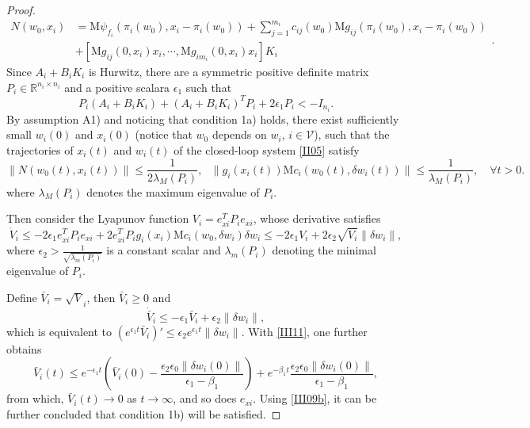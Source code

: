 \documentclass[onecolumn,a4paper,12pt]{article}
\newcommand{\real}{\mathbb{R}}
\numberwithin{equation}{section}
\begin{document}
\begin{proof}
\begin{equation}
\begin{split}
N(w_0,x_i)&=\mathrm{M}\psi_{f_i}(\pi_i(w_0),x_i-\pi_i(w_0))+\sum_{j=1}^{m_i} c_{ij}(w_0)\mathrm{M}g_{ij}(\pi_i(w_0),x_i-\pi_i(w_0)) \\&+
  \left[\mathrm{M}g_{ij}(0,x_i)x_i,\cdots, \mathrm{M}g_{im_i}(0,x_i)x_i\right]K_i
\end{split}.
\end{equation}
Since $A_i+B_iK_i$ is Hurwitz, there are a symmetric positive definite matrix $P_i\in\real^{n_i\times n_i}$ and a positive scalara $\epsilon_1$ such that
\begin{equation}
  \label{III17}
P_i(A_i+B_iK_i)+(A_i+B_iK_i)^TP_i+2\epsilon_1P_i<-I_{n_i}.
\end{equation}
By assumption A1) and noticing that condition 1a) holds, there exist sufficiently small $w_i(0)$ and $x_i(0)$ (notice that $w_0$ depends on $w_i$, $i\in\mathcal{V}$), such that the trajectories of $x_i(t)$ and $w_i(t)$ of the closed-loop system \eqref{II05} satisfy
\begin{equation}
  \|N(w_0(t),x_i(t))\|\le \frac{1}{2\lambda_M(P_i)},\,\, \,\, \|g_i(x_i(t))\mathrm{M}c_i(w_0(t),\delta w_i(t))\|\le \frac{1}{\lambda_M(P_i)}, \quad \forall t>0.
\end{equation}
where $\lambda_M(P_i)$ denotes the maximum eigenvalue of $P_i$.

Then consider the Lyapunov function $V_i=e_{xi}^TP_ie_{xi}$, whose derivative satisfies
\begin{equation}
  \dot{V}_i\le - 2\epsilon_1e_{xi}^TP_ie_{xi} + 2e_{xi}^TP_i g_i(x_i)\mathrm{M}c_i(w_0,\delta w_i)\delta w_i
  \le -2\epsilon_1 V_i + 2\epsilon_2 \sqrt{V_i}\|\delta w_i\|,
\end{equation}
where $\epsilon_2>\frac{1}{\sqrt{\lambda_{m}(P_i)}}$ is a constant scalar and $\lambda_m(P_i)$ denoting the minimal eigenvalue of $P_i$.

Define $\bar{V}_i=\sqrt{V}_i$, then $\bar{V}_i\ge0$ and
\begin{equation}
  \dot{\bar{V}}_i\le -\epsilon_1\bar{V}_i+\epsilon_2 \|\delta w_i\|,
\end{equation}
which is equivalent to $\left(e^{\epsilon_1t}\bar{V}_i\right)'\le \epsilon_2 e^{\epsilon_1t}\|\delta w_i\|$. With \eqref{III11}, one further obtains
\begin{equation}
  \bar{V}_i(t)\le  e^{-\epsilon_1 t}\left(\bar{V}_i(0)-\frac{\epsilon_2\epsilon_0\|\delta w_i(0)\|}{\epsilon_1-\beta_1} \right) + e^{-\beta_1 t}\frac{\epsilon_2\epsilon_0\|\delta w_i(0)\|}{\epsilon_1-\beta_1},
\end{equation}
from which, $\bar{V}_i(t)\rightarrow 0$ as $t\rightarrow \infty$, and so does $e_{xi}$. Using \eqref{III09b}, it can be further concluded that condition 1b) will be satisfied.
\end{proof}
\end{document}
